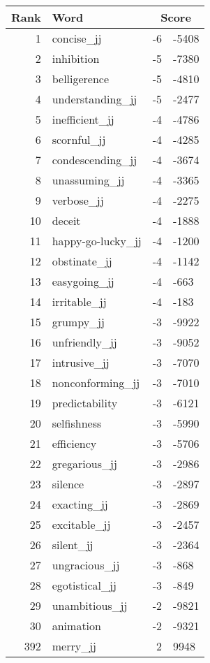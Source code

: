 \begin{longtable}[!htbp]{| rlr@{.}l |}
    \hline
    \textbf{Rank} & \textbf{Word} & \multicolumn{2}{c|}{\textbf{Score}} \\
    \hline
    \endhead
    1 & concise\_jj & -6 & -5408 \\
    2 & inhibition & -5 & -7380 \\
    3 & belligerence & -5 & -4810 \\
    4 & understanding\_jj & -5 & -2477 \\
    5 & inefficient\_jj & -4 & -4786 \\
    6 & scornful\_jj & -4 & -4285 \\
    7 & condescending\_jj & -4 & -3674 \\
    8 & unassuming\_jj & -4 & -3365 \\
    9 & verbose\_jj & -4 & -2275 \\
    10 & deceit & -4 & -1888 \\
    11 & happy-go-lucky\_jj & -4 & -1200 \\
    12 & obstinate\_jj & -4 & -1142 \\
    13 & easygoing\_jj & -4 & -663 \\
    14 & irritable\_jj & -4 & -183 \\
    15 & grumpy\_jj & -3 & -9922 \\
    16 & unfriendly\_jj & -3 & -9052 \\
    17 & intrusive\_jj & -3 & -7070 \\
    18 & nonconforming\_jj & -3 & -7010 \\
    19 & predictability & -3 & -6121 \\
    20 & selfishness & -3 & -5990 \\
    21 & efficiency & -3 & -5706 \\
    22 & gregarious\_jj & -3 & -2986 \\
    23 & silence & -3 & -2897 \\
    24 & exacting\_jj & -3 & -2869 \\
    25 & excitable\_jj & -3 & -2457 \\
    26 & silent\_jj & -3 & -2364 \\
    27 & ungracious\_jj & -3 & -868 \\
    28 & egotistical\_jj & -3 & -849 \\
    29 & unambitious\_jj & -2 & -9821 \\
    30 & animation & -2 & -9321 \\
    392 & merry\_jj & 2 & 9948 \\

\end{longtable}
